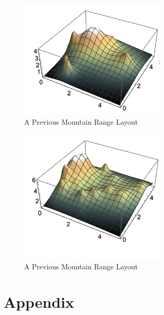 \documentclass[12pt]{article}   %
\theoremstyle{definition}
\numberwithin{equation}{section}
\begin{document}
\begin{figure} [h]
  \centering
  \includegraphics[width=7cm]{../images/mtn2.png}
  \caption{A Previous Mountain Range Layout}
\end{figure}

\begin{figure} [h]
  \centering
  \includegraphics[width=7cm]{../images/mtn3.png}
  \caption{A Previous Mountain Range Layout}
\end{figure}
\section{Appendix} \label{APPM2350proj02sec08}


\end{document}
